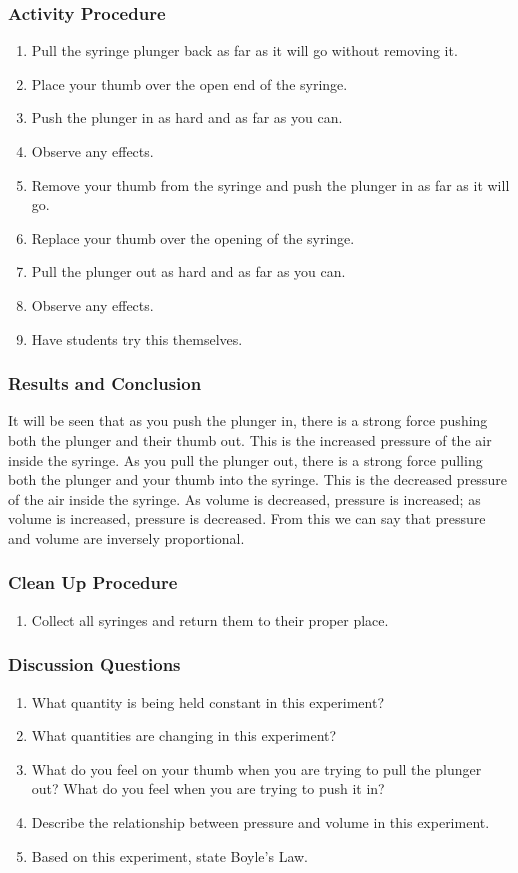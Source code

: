 \subsubsection*{Activity Procedure}
\begin{enumerate}
\item{Pull the syringe plunger back as far as it will go without removing it.} 
\item{Place your thumb over the open end of the syringe.} 
\item{Push the plunger in as hard and as far as you can.} 
\item{Observe any effects.} 
\item{Remove your thumb from the syringe and push the plunger in as far as it will go.} 
\item{Replace your thumb over the opening of the syringe.} 
\item{Pull the plunger out as hard and as far as you can.} 
\item{Observe any effects.} 
\item{Have students try this themselves.} 
\end{enumerate}

\subsubsection*{Results and Conclusion}
It will be seen that as you push the plunger in, there is a strong force pushing both the plunger and their thumb out.  This is the increased pressure of the air inside the syringe.  As you pull the plunger out, there is a strong force pulling both the plunger and your thumb into the syringe. This is the decreased pressure of the air inside the syringe.  As volume is decreased, pressure is increased; as volume is increased, pressure is decreased.  From this we can say that pressure and volume are inversely proportional.  

\subsubsection*{Clean Up Procedure}
\begin{enumerate}
\item{Collect all syringes and return them to their proper place.} 
\end{enumerate}

\subsubsection*{Discussion Questions}
\begin{enumerate}
\item{What quantity is being held constant in this experiment?}
\item{What quantities are changing in this experiment?}
\item{What do you feel on your thumb when you are trying to pull the plunger out? What do you feel when you are trying to push it in?}
\item{Describe the relationship between pressure and volume in this experiment.} 
\item{Based on this experiment, state Boyle's Law.} 
\end{enumerate}

